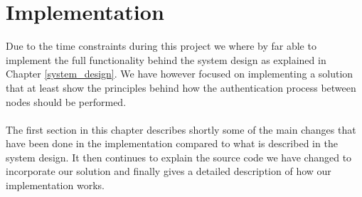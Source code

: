 \lstset{language=sh}
\chapter{Implementation}
\label{implementation}
Due to the time constraints during this project we where by far able to implement the full functionality behind the system design as explained in Chapter \ref{system_design}. We have however focused on implementing a solution that at least show the principles behind how the authentication process between nodes should be performed.
\\\\
The first section in this chapter describes shortly some of the main changes that have been done in the implementation compared to what is described in the system design. It then continues to explain the source code we have changed to incorporate our solution and finally gives a detailed description of how our implementation works. 

